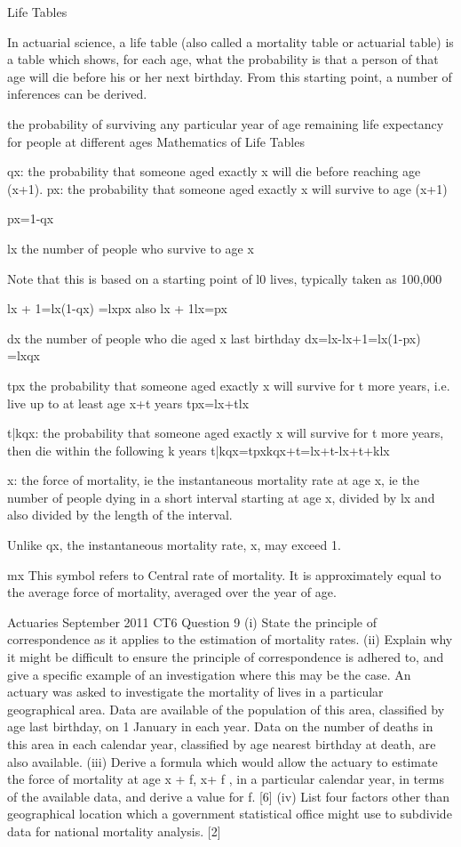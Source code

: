  
Life Tables
 
In actuarial science, a life table (also called a mortality table or actuarial table) is a table which shows, for each age, what the probability is that a person of that age will die before his or her next birthday. From this starting point, a number of inferences can be derived.
 
the probability of surviving any particular year of age
remaining life expectancy for people at different ages
Mathematics of Life Tables
 
qx: the probability that someone aged exactly x will die before reaching age (x+1).
px: the probability that someone aged exactly x will survive to age (x+1)
 
px=1-qx
 
lx the number of people who survive to age x
 
Note that this is based on a starting point of l0 lives, typically taken as 100,000
 
 
        lx + 1=lx(1-qx) =lxpx            also  lx + 1lx=px
 
dx the number of people who die aged x last birthday
        dx=lx-lx+1=lx(1-px) =lxqx 
 
tpx the probability that someone aged exactly x will survive for t more years, i.e. live up to at least age x+t years
        tpx=lx+tlx 
 
 t|kqx: the probability that someone aged exactly x will survive for t more years, then die within the following k years
        t|kqx=tpxkqx+t=lx+t-lx+t+klx 
 
 
x: the force of mortality, ie the instantaneous mortality rate at age x, ie the number of people dying in a short interval starting at age x, divided by lx and also divided by the length of the interval.
 
Unlike qx, the instantaneous mortality rate, x, may exceed 1.
 
mx  This symbol refers to Central rate of mortality. It is approximately equal to the average force of mortality, averaged over the year of age.
 
 
Actuaries September 2011 CT6 Question 9
(i) State the principle of correspondence as it applies to the estimation of mortality rates. 
(ii) Explain why it might be difficult to ensure the principle of correspondence is adhered to, and give a specific example of an investigation where this may be
the case. 
An actuary was asked to investigate the mortality of lives in a particular geographical area. Data are available of the population of this area, classified by age last birthday,
on 1 January in each year. Data on the number of deaths in this area in each calendar year, classified by age nearest birthday at death, are also available.
(iii) Derive a formula which would allow the actuary to estimate the force of mortality at age x + f, x+ f , in a particular calendar year, in terms of the
available data, and derive a value for f. [6]
(iv) List four factors other than geographical location which a government statistical office might use to subdivide data for national mortality analysis. [2]

